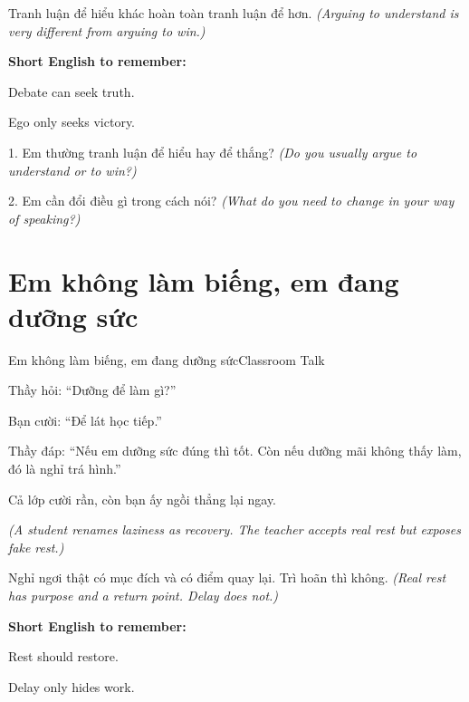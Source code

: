 \begin{baihoc}
Tranh luận để hiểu khác hoàn toàn tranh luận để hơn.
\textit{(Arguing to understand is very different from arguing to win.)}
\end{baihoc}

\begin{ghinhoanh}
\textbf{Short English to remember:}

Debate can seek truth.

Ego only seeks victory.
\end{ghinhoanh}

\begin{tuhocnhanh}
1. Em thường tranh luận để hiểu hay để thắng? \textit{(Do you usually argue to understand or to win?)}

2. Em cần đổi điều gì trong cách nói? \textit{(What do you need to change in your way of speaking?)}
\end{tuhocnhanh}
\ngancach

\section{Em không làm biếng, em đang dưỡng sức}
\begin{truyen}{Em không làm biếng, em đang dưỡng sức}{Classroom Talk}

Thầy hỏi: ``Dưỡng để làm gì?''

Bạn cười: ``Để lát học tiếp.''

Thầy đáp: ``Nếu em dưỡng sức đúng thì tốt. Còn nếu dưỡng mãi không thấy làm, đó là nghỉ trá hình.''

Cả lớp cười rần, còn bạn ấy ngồi thẳng lại ngay.

\textit{(A student renames laziness as recovery. The teacher accepts real rest but exposes fake rest.)}
\end{truyen}

\begin{baihoc}
Nghỉ ngơi thật có mục đích và có điểm quay lại. Trì hoãn thì không.
\textit{(Real rest has purpose and a return point. Delay does not.)}
\end{baihoc}

\begin{ghinhoanh}
\textbf{Short English to remember:}

Rest should restore.

Delay only hides work.
\end{ghinhoanh}

